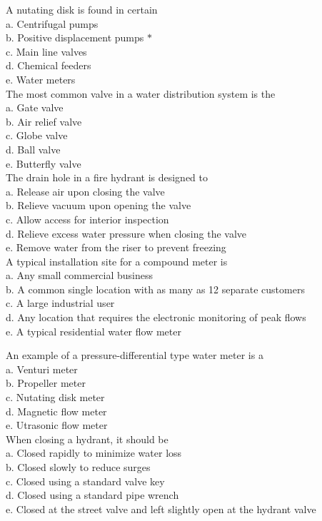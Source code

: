 A nutating disk is found in certain\\
a. Centrifugal pumps\\
b. Positive displacement pumps $*$\\
c. Main line valves\\
d. Chemical feeders\\
e. Water meters\\

The most common valve in a water distribution system is the\\
a. Gate valve\\
b. Air relief valve\\
c. Globe valve\\
d. Ball valve\\
e. Butterfly valve\\

The drain hole in a fire hydrant is designed to\\
a. Release air upon closing the valve\\
b. Relieve vacuum upon opening the valve\\
c. Allow access for interior inspection\\
d. Relieve excess water pressure when closing the valve\\
e. Remove water from the riser to prevent freezing\\

A typical installation site for a compound meter is\\
a. Any small commercial business\\
b. A common single location with as many as 12 separate customers\\
c. A large industrial user\\
d. Any location that requires the electronic monitoring of peak flows\\
e. A typical residential water flow meter 

An example of a pressure-differential type water meter is a\\
a. Venturi meter\\
b. Propeller meter\\
c. Nutating disk meter\\
d. Magnetic flow meter\\
e. Utrasonic flow meter\\

When closing a hydrant, it should be\\
a. Closed rapidly to minimize water loss\\
b. Closed slowly to reduce surges\\
c. Closed using a standard valve key\\
d. Closed using a standard pipe wrench\\
e. Closed at the street valve and left slightly open at the hydrant valve\\

